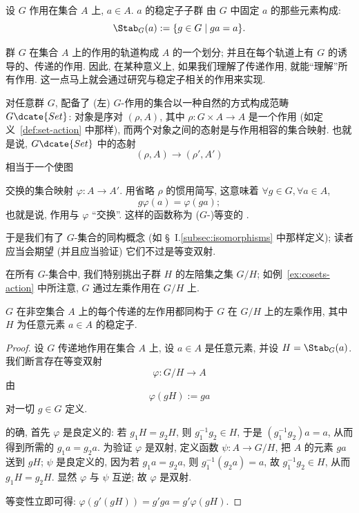 \begin{definition}
\label{def:stabilizer}
设 $G$ 作用在集合 $A$ 上, $a \in A$. $a$ 的稳定子子群%
由 $G$ 中固定 $a$ 的那些元素构成:
\[
\Stab_G(a) := \{g \in G \mid ga = a\}.
\]
\end{definition}

群 $G$ 在集合 $A$ 上的作用的轨道构成 $A$ 的一个划分; 并且在每个轨道上有 $G$ 的诱导的、传递的作用. 因此, 在某种意义上, 如果我们理解了传递作用, 就能``理解''所有作用. 这一点马上就会通过研究与稳定子相关的作用来实现.

对任意群 $G$, 配备了 (左) $G$-作用的集合以一种自然的方式构成范畴 $G\dcate{Set}$: 对象是序对 $(\rho, A)$, 其中 $\rho : G \times A \to A$ 是一个作用 (如定义~\ref{def:set-action} 中那样), 而两个对象之间的态射是与作用相容的集合映射. 也就是说, $G\dcate{Set}$ 中的态射
\[
(\rho, A) \rightarrow (\rho', A')
\]
相当于一个使图
\begin{center}
\end{center}
交换的集合映射 $\varphi : A \to A'$. 用省略 $\rho$ 的惯用简写, 这意味着 $\forall g \in G, \forall a \in A$,
\[
g \varphi(a) = \varphi(ga);
\]
也就是说, 作用与 $\varphi$ ``交换''. 这样的函数称为 ($G$-)等变的%
.

于是我们有了 $G$-集合的同构概念 (如 \S~I.\ref{subsec:isomorphisms} 中那样定义); 读者应当会期望 (并且应当验证) 它们不过是等变双射.

在所有 $G$-集合中, 我们特别挑出子群 $H$ 的左陪集之集 $G/H$; 如例~\ref{ex:cosets-action} 中所注意, $G$ 通过左乘作用在 $G/H$ 上.

\begin{proposition}
\label{prop:transitive-orbits}
$G$ 在非空集合 $A$ 上的每个传递的左作用都同构于 $G$ 在 $G/H$ 上的左乘作用, 其中 $H$ 为任意元素 $a \in A$ 的稳定子.
\end{proposition}

\begin{proof}
设 $G$ 传递地作用在集合 $A$ 上, 设 $a \in A$ 是任意元素, 并设 $H = \Stab_G(a)$. 我们断言存在等变双射
\[
\varphi : G/H \to A
\]
由
\[
\varphi(gH) := ga
\]
对一切 $g \in G$ 定义.

的确, 首先 $\varphi$ 是良定义的: 若 $g_1 H = g_2 H$, 则 $g_1^{-1}g_2 \in H$, 于是 $(g_1^{-1}g_2)a = a$, 从而得到所需的 $g_1 a = g_2 a$. 为验证 $\varphi$ 是双射, 定义函数 $\psi : A \to G/H$, 把 $A$ 的元素 $ga$ 送到 $gH$; $\psi$ 是良定义的, 因为若 $g_1 a = g_2 a$, 则 $g_1^{-1}(g_2 a) = a$, 故 $g_1^{-1}g_2 \in H$, 从而 $g_1 H = g_2 H$. 显然 $\varphi$ 与 $\psi$ 互逆; 故 $\varphi$ 是双射.

等变性立即可得: $\varphi(g'(gH)) = g'ga = g'\varphi(gH)$.
\end{proof}

